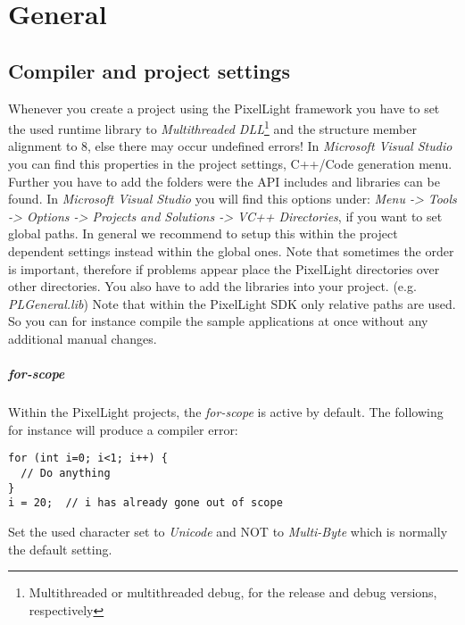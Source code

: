 \chapter{General}




\section{Compiler and project settings}
Whenever you create a project using the PixelLight framework you have to set the used runtime library to \emph{Multithreaded DLL}\footnote{Multithreaded or multithreaded debug, for the release and debug versions, respectively} and the structure member alignment to 8, else there may occur undefined errors! In \emph{Microsoft Visual Studio} you can find this properties in the project settings, C++/Code generation menu. Further you have to add the folders were the API includes and libraries can be found. In \emph{Microsoft Visual Studio} you will find this options under: \emph{Menu -> Tools -> Options -> Projects and Solutions -> VC++ Directories}, if you want to set global paths. In general we recommend to setup this within the project dependent settings instead within the global ones. Note that sometimes the order is important, therefore if problems appear place the PixelLight directories over other directories. You also have to add the libraries into your project. (e.g. \emph{PLGeneral.lib}) Note that within the PixelLight SDK only relative paths are used. So you can for instance compile the sample applications at once without any additional manual changes.


\paragraph{for-scope}
Within the PixelLight projects, the \emph{for-scope} is active by default. The following for instance will produce a compiler error:
\begin{lstlisting}[caption=for-scope]
for (int i=0; i<1; i++) {
  // Do anything
}
i = 20;  // i has already gone out of scope
\end{lstlisting}
Set the used character set to \emph{Unicode} and NOT to \emph{Multi-Byte} which is normally the default setting.




